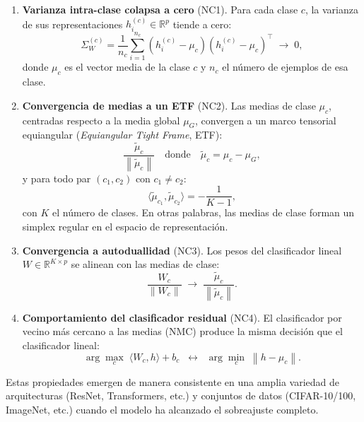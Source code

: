 \documentclass[12pt,a4paper]{report}
\newcommand{\R}{\mathbb{R}}
\newcommand{\norm}[1]{\left\lVert#1\right\rVert}
\newcommand{\inner}[2]{\langle #1, #2 \rangle}
\begin{document}
\begin{enumerate}[label=NC\arabic*:]
    \item \textbf{Varianza intra-clase colapsa a cero} (NC1). Para cada clase $c$, la varianza de sus representaciones $h_i^{(c)} \in \R^p$ tiende a cero:
    \begin{equation}
        \Sigma_W^{(c)} = \frac{1}{n_c}\sum_{i=1}^{n_c} (h_i^{(c)} - \mu_c)(h_i^{(c)} - \mu_c)^\top \;\longrightarrow\; 0,
    \end{equation}
    donde $\mu_c$ es el vector media de la clase $c$ y $n_c$ el número de ejemplos de esa clase.

    \item \textbf{Convergencia de medias a un ETF} (NC2). Las medias de clase $\mu_c$, centradas respecto a la media global $\mu_G$, convergen a un marco tensorial equiangular (\emph{Equiangular Tight Frame}, ETF):
    \begin{equation}
        \frac{\tilde{\mu}_c}{\norm{\tilde{\mu}_c}} \quad\text{donde}\quad \tilde{\mu}_c = \mu_c - \mu_G,
    \end{equation}
    y para todo par $(c_1, c_2)$ con $c_1 \neq c_2$:
    \begin{equation}
        \inner{\tilde{\mu}_{c_1}}{\tilde{\mu}_{c_2}} = -\frac{1}{K-1},
    \end{equation}
    con $K$ el número de clases. En otras palabras, las medias de clase forman un simplex regular en el espacio de representación.

    \item \textbf{Convergencia a autoduallidad} (NC3). Los pesos del clasificador lineal $W \in \R^{K \times p}$ se alinean con las medias de clase:
    \begin{equation}
        \frac{W_c}{\norm{W_c}} \;\longrightarrow\; \frac{\tilde{\mu}_c}{\norm{\tilde{\mu}_c}}.
    \end{equation}

    \item \textbf{Comportamiento del clasificador residual} (NC4). El clasificador por vecino más cercano a las medias (NMC) produce la misma decisión que el clasificador lineal:
    \begin{equation}
        \arg\max_c \; \inner{W_c}{h} + b_c \;\; \longleftrightarrow \;\; \arg\min_c \; \norm{h - \mu_c}.
    \end{equation}
\end{enumerate}

Estas propiedades emergen de manera consistente en una amplia variedad de arquitecturas (ResNet, Transformers, etc.) y conjuntos de datos (CIFAR-10/100, ImageNet, etc.) cuando el modelo ha alcanzado el sobreajuste completo.
\end{document}
